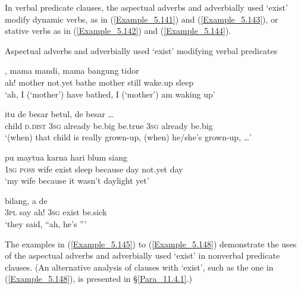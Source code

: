 In verbal predicate clauses, the aspectual adverbs and adverbially used  ‘exist’ modify dynamic verbs, as in (\ref{Example_5.141}) and (\ref{Example_5.143}), or stative verbs as in (\ref{Example_5.142}) and (\ref{Example_5.144}).


\begin{styleExampleTitle}
Aspectual adverbs and adverbially used  ‘exist’ modifying verbal predicates
\end{styleExampleTitle}

\ea
\label{Example_5.141}
, {mama} {} {mandi,} {mama} {} {bangung} {tidor}\\ %
 ah!  mother  not.yet  bathe  mother  still  wake.up  sleep\\
\glt 
‘ah, I (‘mother’) have  bathed, I (‘mother’) am  waking up’ \textstyleExampleSource{[080924-002-Pr.0007]}
\z

\ea
\label{Example_5.142}
 {itu} {de} {} {besar} {betul,} {de} {} {besar} {{\ldots}}\\ %
 child  \textsc{d.dist}  \textsc{3sg}  already  be.big  be.true  \textsc{3sg}  already  be.big  \\
\glt 
‘(when) that child is  really grown-up, (when) he/she’s  grown-up, {\ldots}’ \textstyleExampleSource{[081006-025-CvEx.0005]}
\z

\ea
\label{Example_5.143}
 {pu} {maytua} {} {} {karna} {hari} {blum} {siang}\\ %
 \textsc{1sg}  \textsc{poss}  wife  exist  sleep  because  day  not.yet  day\\
\glt 
‘my wife  because it wasn’t daylight yet’ \textstyleExampleSource{[080919-004-NP.0026]}
\z

\ea
\label{Example_5.144}
 {bilang,} {a} {de} {} {}\\ %
 \textsc{3pl}  say  ah!  \textsc{3sg}  exist  be.sick\\
\glt 
‘they said, ``ah, he’s ''' \textstyleExampleSource{[080919-007-CvNP.0025]}
\z


The examples in (\ref{Example_5.145}) to (\ref{Example_5.148}) demonstrate the uses of the aspectual adverbs and adverbially used  ‘exist’ in nonverbal predicate clauses. (An alternative analysis of clauses with  ‘exist’, such as the one in (\ref{Example_5.148}), is presented in §\ref{Para_11.4.1}.)


